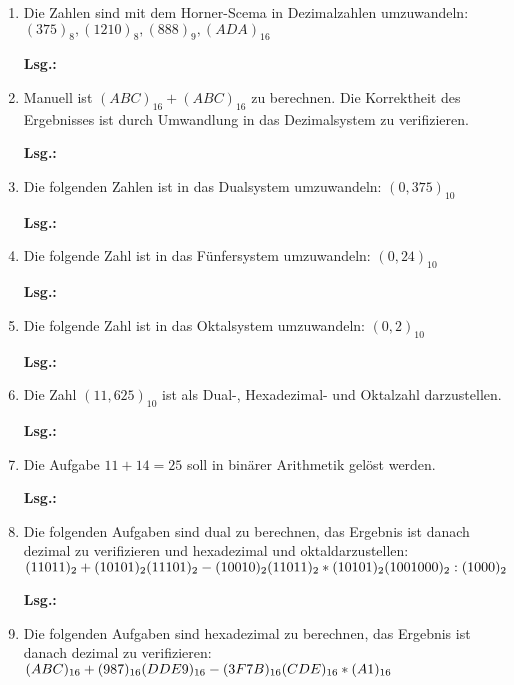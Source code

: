 \documentclass[12pt,a4paper]{scrreprt}
\newcommand{\Lsg}{\par \textbf{Lsg.: }}
\begin{document}
\begin{enumerate}
\Lsg%

\item Die Zahlen sind mit dem Horner-Scema in Dezimalzahlen umzuwandeln: $(375)_8 , (1210)_8 , (888)_9 , (ADA)_{16}$

\Lsg%

\item Manuell ist $(ABC)_{16} + (ABC)_{16}$ zu berechnen. Die Korrektheit des Ergebnisses ist durch Umwandlung in das Dezimalsystem zu verifizieren.

\Lsg%

\item Die folgenden Zahlen ist in das Dualsystem umzuwandeln: $(0,375)_{10}$

\Lsg%

\item Die folgende Zahl ist in das Fünfersystem umzuwandeln: $(0,24)_{10}$

\Lsg%

\item Die folgende Zahl ist in das Oktalsystem umzuwandeln: $(0,2)_{10}$

\Lsg%

\item Die Zahl $(11,625)_{10}$ ist als Dual-, Hexadezimal- und Oktalzahl darzustellen.

\Lsg%

\item Die Aufgabe $11+14=25$ soll in binärer Arithmetik gelöst werden.

\Lsg%

\item Die folgenden Aufgaben sind dual zu berechnen, das Ergebnis ist danach dezimal zu verifizieren und hexadezimal und oktaldarzustellen: \\
\begin{math}
(11011)_2 + (10101)_2  \\
(11101)_2 - (10010)_2  \\
(11011)_2 * (10101)_2  \\
(1001000)_2 : (1000)_2
\end{math}

\Lsg%

\item Die folgenden Aufgaben sind hexadezimal zu berechnen, das Ergebnis ist danach dezimal zu verifizieren: \\
\begin{math}
(ABC)_{16} + (987)_{16}   \\
(DDE9)_{16} - (3F7B)_{16} \\
(CDE)_{16} * (A1)_{16}
\end{math}


\end{enumerate}
\end{document}
